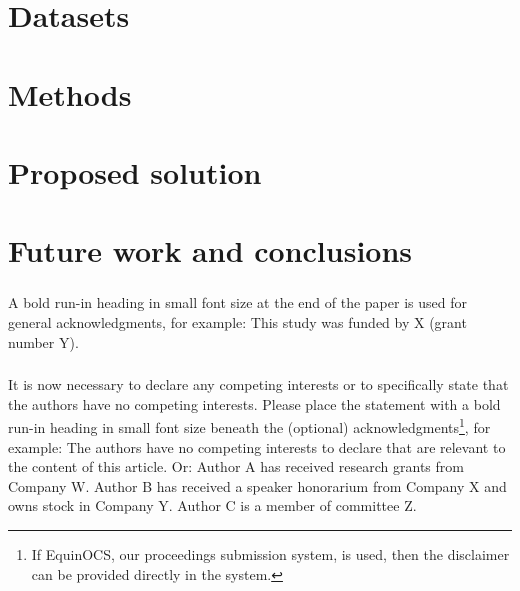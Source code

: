 \documentclass[runningheads]{llncs}
\begin{document}



\section{Datasets}
\label{sec:datasets}


\section{Methods}
\label{sec:methods}


\section{Proposed solution}
\label{sec:solution}


\section{Future work and conclusions}
\label{sec:conclusions}

\begin{credits}
\subsubsection{\ackname} A bold run-in heading in small font size at the end of the paper is
used for general acknowledgments, for example: This study was funded
by X (grant number Y).

\subsubsection{\discintname}
It is now necessary to declare any competing interests or to specifically
state that the authors have no competing interests. Please place the
statement with a bold run-in heading in small font size beneath the
(optional) acknowledgments\footnote{If EquinOCS, our proceedings submission
system, is used, then the disclaimer can be provided directly in the system.},
for example: The authors have no competing interests to declare that are
relevant to the content of this article. Or: Author A has received research
grants from Company W. Author B has received a speaker honorarium from
Company X and owns stock in Company Y. Author C is a member of committee Z.
\end{credits}
%
%
%


%
\end{document}
